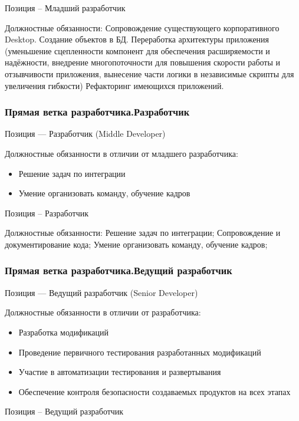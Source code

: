 \documentclass{../industrial-development}
\begin{document}
\lecturenotes
Позиция – Младший разработчик

Должностные обязанности:
Сопровождение существующего корпоративного Desktop. 
Создание объектов в БД.
Переработка архитектуры приложения (уменьшение сцепленности компонент для обеспечения расширяемости и надёжности, внедрение многопоточности для повышения скорости работы и отзывчивости приложения, вынесение части логики в независимые скрипты для увеличения гибкости)
Рефакторинг имеющихся приложений.

\begin{frame} \frametitle{Прямая ветка разработчика.Разработчик}
 \begin{block}{}
  \alert{Позиция --- Разработчик (Middle Developer)}

Должностные обязанности в отличии от младшего разработчика: 
  \end{block}
  \begin{itemize}
  \item Решение задач по интеграции
  \item Умение организовать  команду, обучение кадров
  \end{itemize}
\end{frame}

\lecturenotes
Позиция – Разработчик 

Должностные обязанности:
Решение задач по интеграции;
Сопровождение и документирование кода;
Умение организовать  команду, обучение кадров;


\begin{frame} \frametitle{Прямая ветка разработчика.Ведущий разработчик}
 \begin{block}{}
  \alert{Позиция --- Ведущий разработчик (Senior Developer)}

Должностные обязанности в отличии от разработчика: 
  \end{block}
  \begin{itemize}
  \item Разработка модификаций
  \item Проведение первичного тестирования разработанных модификаций
 \item  Участие в автоматизации тестирования и развертывания
  \item Обеспечение контроля безопасности создаваемых продуктов на всех этапах
  \end{itemize}
\end{frame}

\lecturenotes
Позиция – Ведущий разработчик 
\end{document}
